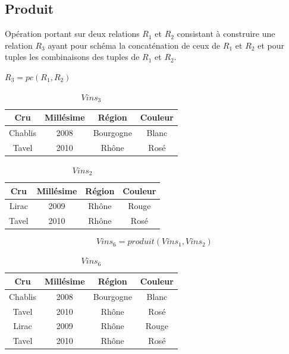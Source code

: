\documentclass[12pt,a4paper,openany]{book}
\begin{document}
		\subsection{Produit}
		\begin{definition}
			Opération portant sur deux relations $R_1$ et $R_2$ consistant à construire une relation $R_3$ ayant pour schéma la concaténation
			de ceux de $R_1$ et $R_2$ et pour tuples les combinaisons des tuples de $R_1$ et $R_2$.
		\end{definition}
		\begin{notation}
			$R_3 =  pc(R_1, R_2)$
		\end{notation}
		\begin{exemple}
			\begin{table}[H]
			\centering
			\begin{tabular}{c|c|c|c}
				\textbf{Cru} & \textbf{Millésime} & \textbf{Région} & \textbf{Couleur}\\
				\hline
				Chablis & 2008 & Bourgogne & Blanc\\
				Tavel & 2010 & Rhône & Rosé\\
			\end{tabular}
			\caption{$Vins_3$}
		\end{table}
		\begin{table}[H]
			\centering
			\begin{tabular}{c|c|c|c}
				\textbf{Cru} & \textbf{Millésime} & \textbf{Région} & \textbf{Couleur}\\
				\hline
				Lirac & 2009 & Rhône & Rouge \\
				Tavel & 2010 & Rhône & Rosé\\
			\end{tabular}
			\caption{$Vins_2$}
		\end{table}
		$$Vins_6 = produit(Vins_1, Vins_2)$$
		\begin{table}[H]
			\centering
			\begin{tabular}{c|c|c|c}
				\textbf{Cru} & \textbf{Millésime} & \textbf{Région} & \textbf{Couleur}\\
				\hline
				Chablis & 2008 & Bourgogne & Blanc\\
				Tavel & 2010 & Rhône & Rosé\\
				Lirac & 2009 & Rhône & Rouge \\
				Tavel & 2010 & Rhône & Rosé\\
			\end{tabular}
			\caption{$Vins_6$}
		\end{table}
		\end{exemple}
\end{document}
